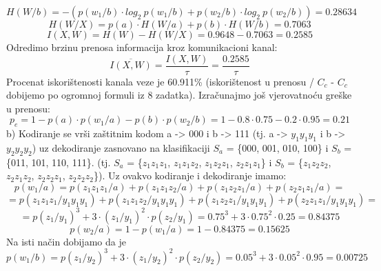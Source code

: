 \documentclass[12pt]{article}
\begin{document}
\begin{enumerate}
\begin{equation*}
    H(W/b) = -(p(w_1/b) \cdot log_2~p(w_1/b) + p(w_2/b) \cdot log_2~p(w_2/b)) = 0.28634
\end{equation*}
\begin{equation*}
    H(W/X) = p(a) \cdot H(W/a) + p(b) \cdot H(W/b) = 0.7063
\end{equation*}
\begin{equation*}
    I(X,W) = H(W) - H(W/X) = 0.9648 - 0.7063 = 0.2585
\end{equation*}
Odredimo brzinu prenosa informacija kroz komunikacioni kanal:
\begin{equation*}
        \overline{I(X,W)} = \frac{I(X,W)}{\tau} = \frac{0.2585}{\tau}
\end{equation*}
Procenat iskorištenosti kanala veze je 60.911\% (iskorištenost u prenosu / $C_c$ - $C_c$ dobijemo po ogromnoj formuli iz 8 zadatka). Izračunajmo još
vjerovatnoću greške u prenosu: 
\begin{equation*}
    p_e = 1 - p(a) \cdot p(w_1/a) - p(b) \cdot p(w_2/b) = 1 - 0.8 \cdot 0.75 - 0.2 \cdot 0.95 = 0.21
\end{equation*}
\newpage
b) Kodiranje se vrši zaštitnim kodom a -> 000 i b -> 111 (tj. a ->
$y_1y_1y_1$ i b -> $y_2y_2y_2$) uz dekodiranje zasnovano na klasifikaciji $S_a$ =
\{000, 001, 010, 100\} i $S_b$ = \{011, 101, 110, 111\}.
(tj. $S_a$ = \{$z_1z_1z_1$, $z_1z_1z_2$, $z_1z_2z_1$, $z_2z_1z_1$\} i $S_b$ = \{$z_1z_2z_2$, $z_2z_1z_2$, $z_2z_2z_1$, $z_2z_2z_2$\}).
Uz ovakvo kodiranje i dekodiranje imamo: \\
\begin{equation*}
    p(w_1/a) = p(z_1z_1z_1/a) + p(z_1z_1z_2/a) + p(z_1z_2z_1/a) + p(z_2z_1z_1/a) = 
\end{equation*}
\begin{equation*}
    = p(z_1z_1z_1/y_1y_1y_1) + p(z_1z_1z_2/y_1y_1y_1) + p(z_1z_2z_1/y_1y_1y_1) + p(z_2z_1z_1/y_1y_1y_1) = 
\end{equation*}
\begin{equation*}
    = p(z_1/y_1)^3 + 3 \cdot (z_1/y_1)^2 \cdot p(z_2/y_1) = 0.75^3 + 3 \cdot 0.75^2 \cdot 0.25 = 0.84375
\end{equation*}
\begin{equation*}
    p(w_2/a) = 1 - p(w_1/a) = 1 - 0.84375 = 0.15625
\end{equation*}
Na isti način dobijamo da je \\
\begin{equation*}
    p(w_1/b) = p(z_1/y_2)^3 + 3 \cdot (z_1/y_2)^2 \cdot p(z_2/y_2) = 0.05^3 + 3 \cdot 0.05^2 \cdot 0.95 = 0.00725

\end{equation*}
\end{enumerate}
\end{document}
